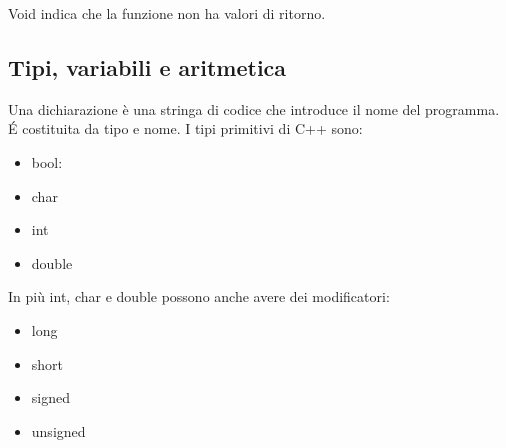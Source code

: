 \documentclass[11pt,a4paper]{book}
\begin{document}
\label{code: 002}
Void indica che la funzione non ha valori di ritorno.

\subsection{Tipi, variabili e aritmetica}
Una dichiarazione è una stringa di codice che introduce il nome del programma. É costituita da tipo e nome. I tipi primitivi di C++ sono:
\begin{itemize}
	\item bool:
	\item char
	\item int
	\item double
\end{itemize}
In più int, char e double possono anche avere dei modificatori:
\begin{itemize}
	\item long
	\item short
	\item signed
	\item unsigned
\end{itemize}
\end{document}
